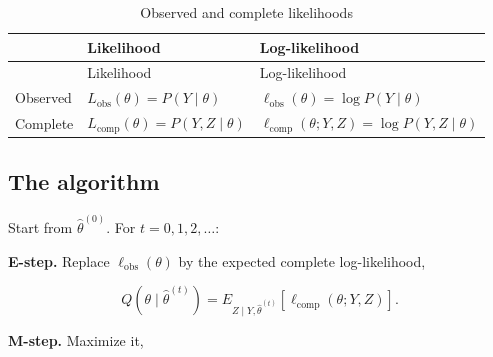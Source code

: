 \documentclass[
  letterpaper,
  DIV=11,
  numbers=noendperiod]{scrreprt}
\begin{document}
\begin{longtable}[]{@{}
  >{\raggedright\arraybackslash}p{}
  >{\raggedright\arraybackslash}p{}
  >{\raggedright\arraybackslash}p{}@{}}
\caption{Observed and complete
likelihoods}\label{tbl-terminology}\tabularnewline
\toprule\noalign{}
\begin{minipage}[b]{\linewidth}\raggedright
\end{minipage} & \begin{minipage}[b]{\linewidth}\raggedright
Likelihood
\end{minipage} & \begin{minipage}[b]{\linewidth}\raggedright
Log-likelihood
\end{minipage} \\
\midrule\noalign{}
\endfirsthead
\toprule\noalign{}
\begin{minipage}[b]{\linewidth}\raggedright
\end{minipage} & \begin{minipage}[b]{\linewidth}\raggedright
Likelihood
\end{minipage} & \begin{minipage}[b]{\linewidth}\raggedright
Log-likelihood
\end{minipage} \\
\midrule\noalign{}
\endhead
\bottomrule\noalign{}
\endlastfoot
Observed & \(L_{\text{obs}}(\theta) = P(Y \mid \theta)\) &
\(\ell_{\text{obs}}(\theta) = \log P(Y \mid \theta)\) \\
Complete & \(L_{\text{comp}}(\theta) = P(Y, Z \mid \theta)\) &
\(\ell_{\text{comp}}(\theta; Y, Z) = \log P(Y, Z \mid \theta)\) \\
\end{longtable}

\subsection{The algorithm}\label{the-algorithm}

Start from \(\hat\theta^{(0)}\). For \(t = 0, 1, 2, \ldots\):

\textbf{E-step.} Replace \(\ell_{\text{obs}}(\theta)\) by the expected
complete log-likelihood,

\[
Q\!\left(\theta \mid \hat\theta^{(t)}\right)
= E_{Z \mid Y, \hat\theta^{(t)}}\!\left[\ell_{\text{comp}}(\theta; Y, Z)\right].
\]

\textbf{M-step.} Maximize it,
\end{document}
